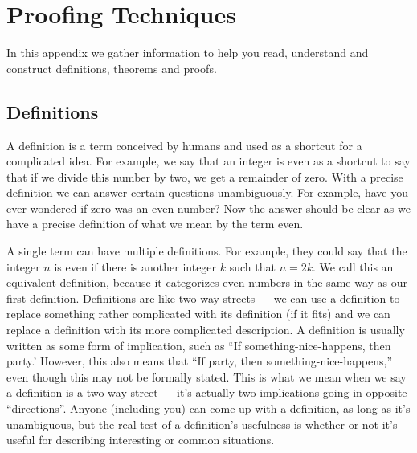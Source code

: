 \chapter{Proofing Techniques}
In this appendix we gather information to help you read, understand and construct definitions, theorems and proofs.

\section{Definitions}
A definition is a term conceived by humans and used as a shortcut for a complicated idea. For example, we say that an integer is even as a shortcut to say that if we divide this number by two, we get a remainder of zero. With a precise definition we can answer certain questions unambiguously. For example, have you ever wondered if zero was an even number? Now the answer should be clear as we have a precise definition of what we mean by the term even.

A single term can have multiple definitions. For example, they could say that the integer $n$ is even if there is another integer $k$ such that $n=2k$. We call this an equivalent definition, because it categorizes even numbers in the same way as our first definition.
%
Definitions are like two-way streets --- we can use a definition to replace something rather complicated with its definition (if it fits) and we can replace a definition with its more complicated description. A definition is usually written as some form of implication, such as ``If something-nice-happens, then party.' However, this also means that ``If party, then something-nice-happens,'' even though this may not be formally stated. This is what we mean when we say a definition is a two-way street --- it's actually two implications going in opposite ``directions''.
%
Anyone (including you) can come up with a definition, as long as it's unambiguous, but the real test of a definition's usefulness is whether or not it's useful for describing interesting or common situations.


